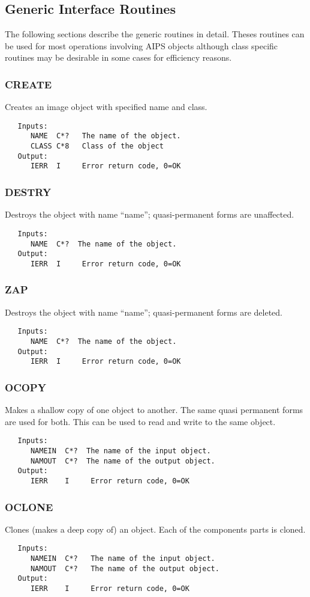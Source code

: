 \subsection{Generic Interface Routines}
   The following sections describe the generic routines in detail.
Theses routines can be used for most operations involving AIPS objects
although class specific routines may be desirable in some cases for
efficiency reasons.
\subsubsection{CREATE}
   Creates an image object with specified name and class.
{\small\begin{verbatim}
   Inputs:
      NAME  C*?   The name of the object.
      CLASS C*8   Class of the object
   Output:
      IERR  I     Error return code, 0=OK
\end{verbatim}}
\subsubsection{DESTRY}
   Destroys the object with name ``name''; quasi-permanent forms are
unaffected.
{\small\begin{verbatim}
   Inputs:
      NAME  C*?  The name of the object.
   Output:
      IERR  I     Error return code, 0=OK
\end{verbatim}}
\subsubsection{ZAP}
   Destroys the object with name ``name''; quasi-permanent forms are
deleted.
{\small\begin{verbatim}
   Inputs:
      NAME  C*?  The name of the object.
   Output:
      IERR  I     Error return code, 0=OK
\end{verbatim}}
\subsubsection{OCOPY}
   Makes a shallow copy of one object to another.  The same quasi
permanent forms are used for both.  This can be used to read and write
to the same object.
{\small\begin{verbatim}
   Inputs:
      NAMEIN  C*?  The name of the input object.
      NAMOUT  C*?  The name of the output object.
   Output:
      IERR    I     Error return code, 0=OK
\end{verbatim}}
\subsubsection{OCLONE}
   Clones (makes a deep copy of) an  object.  Each of the
components parts is cloned.
{\small\begin{verbatim}
   Inputs:
      NAMEIN  C*?   The name of the input object.
      NAMOUT  C*?   The name of the output object.
   Output:
      IERR    I     Error return code, 0=OK
\end{verbatim}}
